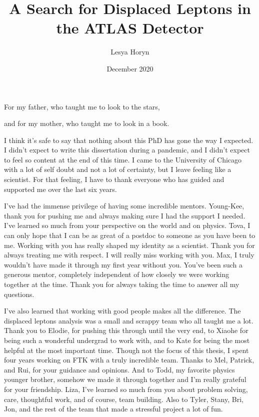 \documentclass{ucetd}
\title{A Search for Displaced Leptons in the ATLAS Detector}
\author{Lesya Horyn}
\date{December 2020}
\begin{document}
\maketitle

\makecopyright

\clearpage
\begin{center}
    \thispagestyle{empty}
    \vspace*{\fill}
    For my father, who taught me to look to the stars, 

    and for my mother, who taught me to look in a book.
    \vspace*{\fill}
\end{center}
\clearpage




\tableofcontents
\listoffigures
\listoftables



\acknowledgments
I think it's safe to say that nothing about this PhD has gone the way I expected. I didn't expect to write this dissertation during a pandemic, and I didn't expect to feel so content at the end of this time. I came to the University of Chicago with a lot of self doubt and not a lot of certainty, but I leave feeling like a scientist. For that feeling, I have to thank everyone who has guided and supported me over the last six years.

I've had the immense privilege of having some incredible mentors.
Young-Kee, thank you for pushing me and always making sure I had the support I needed. I've learned so much from your perspective on the world and on physics. 
Tova, I can only hope that I can be as great of a postdoc to someone as you have been to me. Working with you has really shaped my identity as a scientist. Thank you for always treating me with respect. I will really miss working with you.
Max, I truly wouldn't have made it through my first year without you. You've been such a generous mentor, completely independent of how closely we were working together at the time. Thank you for always taking the time to answer all my questions. 

I've also learned that working with good people makes all the difference. The displaced leptons analysis was a small and scrappy team who all taught me a lot. Thank you to Elodie, for pushing this through until the very end, to Xiaohe for being such a wonderful undergrad to work with, and to Kate for being the most helpful at the most important time. 
Though not the focus of this thesis, I spent four years working on FTK with a truly incredible team. Thanks to Mel, Patrick, and Rui, for your guidance and opinions. And to Todd, my favorite physics younger brother, somehow we made it through together and I'm really grateful for your friendship. 
Liza, I've learned so much from you about problem solving, care, thoughtful work, and of course, team building. Also to Tyler, Stany, Bri, Jon, and the rest of the team that made a stressful project a lot of fun.
\end{document}
